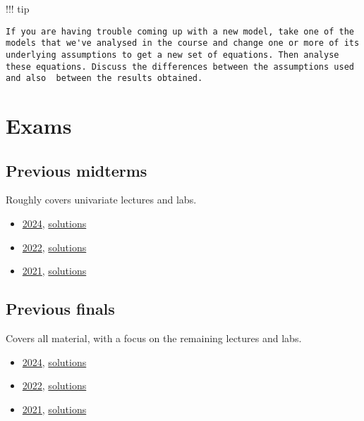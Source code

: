 \documentclass[
]{article}
\providecommand{\tightlist}{%
  \setlength{\itemsep}{0pt}\setlength{\parskip}{0pt}}
\begin{document}
!!! tip

\begin{verbatim}
If you are having trouble coming up with a new model, take one of the models that we've analysed in the course and change one or more of its underlying assumptions to get a new set of equations. Then analyse these equations. Discuss the differences between the assumptions used and also  between the results obtained.
\end{verbatim}

\section{Exams}\label{exams}

\subsection{Previous midterms}\label{previous-midterms}

Roughly covers univariate lectures and labs.

\begin{itemize}
\tightlist
\item
  \href{exam_files/midterm2024.pdf}{2024},
  \href{exam_files/midterm2024_solns.pdf}{solutions}
\item
  \href{exam_files/midterm2022.pdf}{2022},
  \href{exam_files/midterm2022_solns.pdf}{solutions}
\item
  \href{exam_files/midterm2021.pdf}{2021},
  \href{exam_files/midterm2021_solns.pdf}{solutions}
\end{itemize}

\subsection{Previous finals}\label{previous-finals}

Covers all material, with a focus on the remaining lectures and labs.

\begin{itemize}
\tightlist
\item
  \href{exam_files/final2024.pdf}{2024},
  \href{exam_files/final2024_solns.pdf}{solutions}
\item
  \href{exam_files/final2022.pdf}{2022},
  \href{exam_files/final2022_solns.pdf}{solutions}
\item
  \href{exam_files/final2021.pdf}{2021},
  \href{exam_files/final2021_solns.pdf}{solutions}
\end{itemize}
\end{document}
